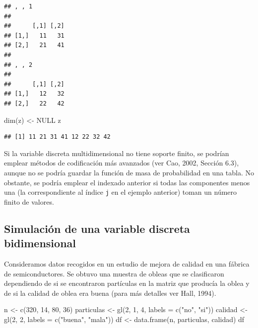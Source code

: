\documentclass[
]{book}
\newenvironment{Shaded}{\begin{snugshade}}{\end{snugshade}}
\newcommand{\AttributeTok}[1]{\textcolor[rgb]{0.77,0.63,0.00}{#1}}
\newcommand{\ConstantTok}[1]{\textcolor[rgb]{0.00,0.00,0.00}{#1}}
\newcommand{\DecValTok}[1]{\textcolor[rgb]{0.00,0.00,0.81}{#1}}
\newcommand{\FunctionTok}[1]{\textcolor[rgb]{0.00,0.00,0.00}{#1}}
\newcommand{\NormalTok}[1]{#1}
\newcommand{\OtherTok}[1]{\textcolor[rgb]{0.56,0.35,0.01}{#1}}
\newcommand{\StringTok}[1]{\textcolor[rgb]{0.31,0.60,0.02}{#1}}
\theoremstyle{break}
\theoremstyle{nonumberplain}
\begin{document}
\begin{verbatim}
## , , 1
## 
##      [,1] [,2]
## [1,]   11   31
## [2,]   21   41
## 
## , , 2
## 
##      [,1] [,2]
## [1,]   12   32
## [2,]   22   42
\end{verbatim}

\begin{Shaded}
\begin{Highlighting}[]
\FunctionTok{dim}\NormalTok{(z) }\OtherTok{\textless{}{-}} \ConstantTok{NULL}
\NormalTok{z}
\end{Highlighting}
\end{Shaded}

\begin{verbatim}
## [1] 11 21 31 41 12 22 32 42
\end{verbatim}

Si la variable discreta multidimensional no tiene soporte finito, se podrían emplear métodos de codificación más avanzados (ver Cao, 2002, Sección 6.3), aunque no se podría guardar la función de masa de probabilidad en una tabla.
No obstante, se podría emplear el indexado anterior si todas las componentes menos una (la correspondiente al índice \texttt{j} en el ejemplo anterior) toman un número finito de valores.

\hypertarget{simulaciuxf3n-de-una-variable-discreta-bidimensional}{%
\subsection{Simulación de una variable discreta bidimensional}\label{simulaciuxf3n-de-una-variable-discreta-bidimensional}}

Consideramos datos recogidos en un estudio de mejora de calidad en una fábrica de semiconductores.
Se obtuvo una muestra de obleas que se clasificaron dependiendo de si se encontraron partículas en la matriz que producía la oblea y de si la calidad de oblea era buena (para más detalles ver Hall, 1994).

\begin{Shaded}
\begin{Highlighting}[]
\NormalTok{n }\OtherTok{\textless{}{-}} \FunctionTok{c}\NormalTok{(}\DecValTok{320}\NormalTok{, }\DecValTok{14}\NormalTok{, }\DecValTok{80}\NormalTok{, }\DecValTok{36}\NormalTok{)}
\NormalTok{particulas }\OtherTok{\textless{}{-}} \FunctionTok{gl}\NormalTok{(}\DecValTok{2}\NormalTok{, }\DecValTok{1}\NormalTok{, }\DecValTok{4}\NormalTok{, }\AttributeTok{labels =} \FunctionTok{c}\NormalTok{(}\StringTok{"no"}\NormalTok{, }\StringTok{"si"}\NormalTok{))}
\NormalTok{calidad }\OtherTok{\textless{}{-}} \FunctionTok{gl}\NormalTok{(}\DecValTok{2}\NormalTok{, }\DecValTok{2}\NormalTok{, }\AttributeTok{labels =} \FunctionTok{c}\NormalTok{(}\StringTok{"buena"}\NormalTok{, }\StringTok{"mala"}\NormalTok{))}
\NormalTok{df }\OtherTok{\textless{}{-}} \FunctionTok{data.frame}\NormalTok{(n, particulas, calidad)}
\NormalTok{df}
\end{Highlighting}
\end{Shaded}
\end{document}
